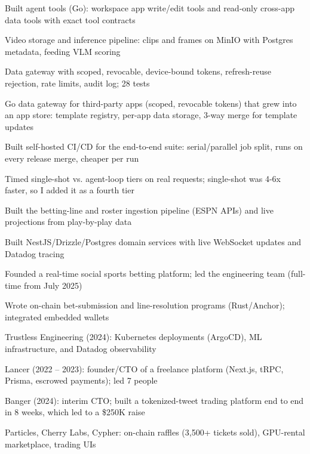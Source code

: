 \documentclass[print]{jack-resume}
\begin{document}
\begin{tightemize}
    \item Built agent tools (Go): workspace app write/edit tools and read-only cross-app data tools with exact tool contracts
    \item Video storage and inference pipeline: clips and frames on MinIO with Postgres metadata, feeding VLM scoring
    \item Data gateway with scoped, revocable, device-bound tokens, refresh-reuse rejection, rate limits, audit log; 28 tests
    \item Go data gateway for third-party apps (scoped, revocable tokens) that grew into an app store: template registry, per-app data storage, 3-way merge for template updates
    \item Built self-hosted CI/CD for the end-to-end suite: serial/parallel job split, runs on every release merge, cheaper per run
    \item Timed single-shot vs. agent-loop tiers on real requests; single-shot was 4-6x faster, so I added it as a fourth tier
\end{tightemize}
\sectionsep

\begin{tightemize}
    \item Built the betting-line and roster ingestion pipeline (ESPN APIs) and live projections from play-by-play data
    \item Built NestJS/Drizzle/Postgres domain services with live WebSocket updates and Datadog tracing
    \item Founded a real-time social sports betting platform; led the engineering team (full-time from July 2025)
    \item Wrote on-chain bet-submission and line-resolution programs (Rust/Anchor); integrated embedded wallets
\end{tightemize}
\sectionsep

\begin{tightemize}
    \item Trustless Engineering (2024): Kubernetes deployments (ArgoCD), ML infrastructure, and Datadog observability
    \item Lancer (2022 – 2023): founder/CTO of a freelance platform (Next.js, tRPC, Prisma, escrowed payments); led 7 people
    \item Banger (2024): interim CTO; built a tokenized-tweet trading platform end to end in 8 weeks, which led to a \$250K raise
    \item Particles, Cherry Labs, Cypher: on-chain raffles (3,500+ tickets sold), GPU-rental marketplace, trading UIs
\end{tightemize}
\sectionsep
\end{document}
